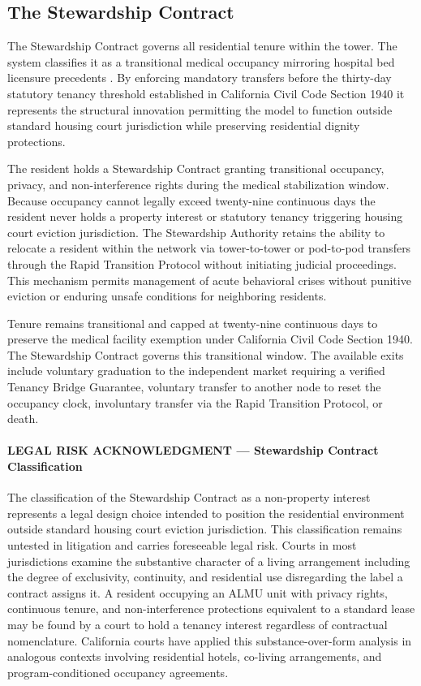 \documentclass[12pt, letterpaper]{article}
\begin{document}
\subsection{The Stewardship Contract}

The Stewardship Contract governs all residential tenure within the tower. The system classifies it as a transitional medical occupancy mirroring hospital bed licensure precedents \citep{sro_hotel_licensure_2024}. By enforcing mandatory transfers before the thirty-day statutory tenancy threshold established in California Civil Code Section 1940 it represents the structural innovation permitting the model to function outside standard housing court jurisdiction while preserving residential dignity protections.

The resident holds a Stewardship Contract granting transitional occupancy, privacy, and non-interference rights during the medical stabilization window. Because occupancy cannot legally exceed twenty-nine continuous days the resident never holds a property interest or statutory tenancy triggering housing court eviction jurisdiction. The Stewardship Authority retains the ability to relocate a resident within the network via tower-to-tower or pod-to-pod transfers through the Rapid Transition Protocol without initiating judicial proceedings. This mechanism permits management of acute behavioral crises without punitive eviction or enduring unsafe conditions for neighboring residents.

Tenure remains transitional and capped at twenty-nine continuous days to preserve the medical facility exemption under California Civil Code Section 1940. The Stewardship Contract governs this transitional window. The available exits include voluntary graduation to the independent market requiring a verified Tenancy Bridge Guarantee, voluntary transfer to another node to reset the occupancy clock, involuntary transfer via the Rapid Transition Protocol, or death.

\paragraph{LEGAL RISK ACKNOWLEDGMENT — Stewardship Contract Classification}
The classification of the Stewardship Contract as a non-property interest represents a legal design choice intended to position the residential environment outside standard housing court eviction jurisdiction. This classification remains untested in litigation and carries foreseeable legal risk. Courts in most jurisdictions examine the substantive character of a living arrangement including the degree of exclusivity, continuity, and residential use disregarding the label a contract assigns it. A resident occupying an ALMU unit with privacy rights, continuous tenure, and non-interference protections equivalent to a standard lease may be found by a court to hold a tenancy interest regardless of contractual nomenclature. California courts have applied this substance-over-form analysis in analogous contexts involving residential hotels, co-living arrangements, and program-conditioned occupancy agreements.
\end{document}
